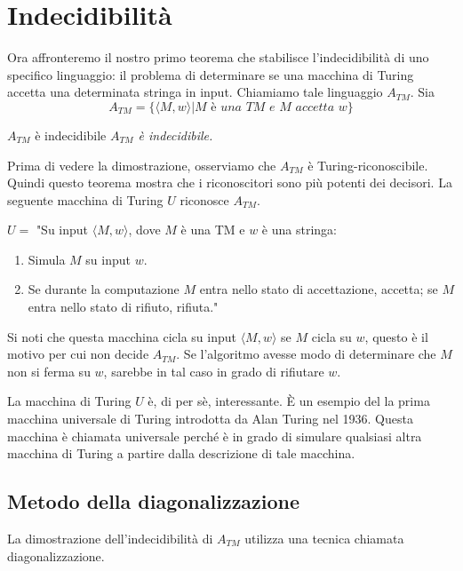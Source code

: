 \section{Indecidibilità}
Ora affronteremo il nostro primo teorema che stabilisce l'indecidibilità di uno specifico linguaggio: il problema di determinare se una macchina di Turing accetta una determinata stringa in input. Chiamiamo tale linguaggio $A_{TM}$. Sia
\begin{equation*}
A_{TM} =\{\langle M,w \rangle | M\textit{ è una TM e } M\textit{ accetta }w\}
\end{equation*}

\begin{Thm}{$A_{TM}$ è indecidibile}{}\label{thm:atm-indecidibile}
\textit{$A_{TM}$ è indecidibile.}

\begin{demonstration}
Prima di vedere la dimostrazione, osserviamo che $A_{TM}$ è Turing-riconoscibile. Quindi questo teorema mostra che i riconoscitori sono più potenti dei decisori. La seguente macchina di Turing $U$ riconosce $A_{TM}$.

$U=$ "Su input $\langle M, w\rangle$, dove $M$ è una TM e $w$ è una stringa:
\begin{enumerate}
    \item Simula $M$ su input $w$.
    \item Se durante la computazione $M$ entra nello stato di accettazione, accetta; se $M$ entra nello stato di rifiuto, rifiuta."
\end{enumerate}

Si noti che questa macchina cicla su input $\langle M, w\rangle$ se $M$ cicla su $w$, questo è il motivo per cui non decide $A_{TM}$. Se l'algoritmo avesse modo di determinare che $M$ non si ferma su $w$, sarebbe in tal caso in grado di rifiutare $w$.
\end{demonstration}
\end{Thm}

La macchina di Turing $U$ è, di per sè, interessante. È un esempio del la prima macchina universale di Turing introdotta da Alan Turing nel 1936. Questa macchina è chiamata universale perché è in grado di simulare qualsiasi altra macchina di Turing a partire dalla descrizione di tale macchina.

\subsection{Metodo della diagonalizzazione}
La dimostrazione dell'indecidibilità di $A_{TM}$ utilizza una tecnica chiamata diagonalizzazione.

